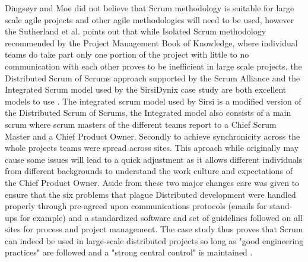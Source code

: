 \documentclass[sigconf]{acmart}
\begin{document}
Dings{\o}yr and Moe did not believe that Scrum methodology is suitable for large scale agile projects and other agile methodologies will need to be used, however the Sutherland et al. \cite{Sutherland07} points out that while Isolated Scrum methodology recommended by the Project Management Book of Knowledge, where individual teams do take part only one portion of the project with little to no communication with each other proves to be inefficient in large scale projects, the Distributed Scrum of Scrums approach supported by the Scrum Alliance and the Integrated Scrum model used by the SirsiDynix case study are both excellent models to use  \cite{Sutherland07}. The integrated scrum model used by Sirsi is a modified version of the Distributed Scrum of Scrums, the Integrated model also consists of a main scrum where scrum masters of the different teams report to a Chief Scrum Master and a Chief Product Owner. Secondly to achieve synchronicity across the whole projects teams were spread across sites. This aproach while originally may cause some issues will lead to a quick adjustment as it allows different individuals from different backgrounds to understand the work culture and expectations of the Chief Product Owner. Aside from these two major changes care was given to ensure that the six problems that plague Distributed development were handled properly through pre-agreed upon communications protocols (emails for stand-ups for example) and a standardized software and set of guidelines followed on all sites for process and project management. The case study thus proves that Scrum can indeed be used in large-scale distributed projects so long as "good engineering practices" are followed and a "strong central control" is maintained \cite{Sutherland07}.



\end{document}
